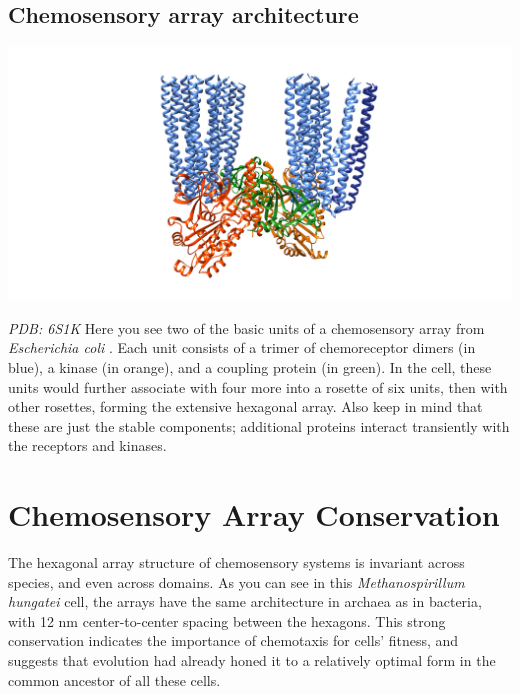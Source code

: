 \documentclass[]{tufte-book}
\begin{document}
\subsection{Chemosensory array
architecture}\label{Chemosensory_array_architecture}

\includegraphics{img/schematics/7_2_1}

\emph{PDB: 6S1K} Here you see two of the basic units of a chemosensory
array from \emph{Escherichia coli} \citep{cassidy2020}. Each unit
consists of a trimer of chemoreceptor dimers (in blue), a kinase (in
orange), and a coupling protein (in green). In the cell, these units
would further associate with four more into a rosette of six units, then
with other rosettes, forming the extensive hexagonal array. Also keep in
mind that these are just the stable components; additional proteins
interact transiently with the receptors and kinases.

\section{Chemosensory Array
Conservation}\label{chemosensory-array-conservation}

The hexagonal array structure of chemosensory systems is invariant
across species, and even across domains. As you can see in this
\emph{Methanospirillum hungatei} cell, the arrays have the same
architecture in archaea as in bacteria, with 12 nm center-to-center
spacing between the hexagons. This strong conservation indicates the
importance of chemotaxis for cells' fitness, and suggests that evolution
had already honed it to a relatively optimal form in the common ancestor
of all these cells.
\end{document}
